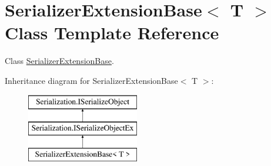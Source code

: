\hypertarget{class_serializer_extension_base}{}\section{Serializer\+Extension\+Base$<$ T $>$ Class Template Reference}
\label{class_serializer_extension_base}


Class \hyperlink{class_serializer_extension_base}{Serializer\+Extension\+Base}.  


Inheritance diagram for Serializer\+Extension\+Base$<$ T $>$\+:\begin{figure}[H]
\begin{center}
\leavevmode
\includegraphics[height=3.000000cm]{class_serializer_extension_base}
\end{center}
\end{figure}
